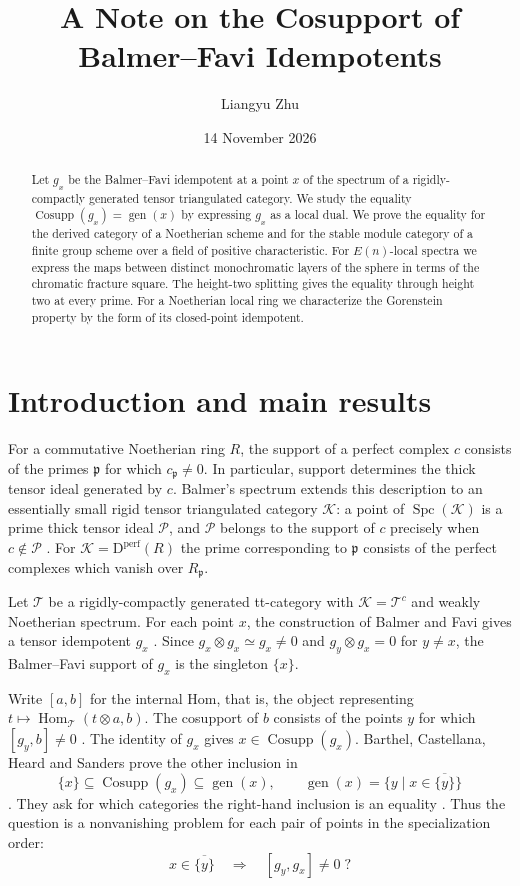 \documentclass[11pt,reqno]{amsart}
\title[Cosupport of Balmer--Favi idempotents]{A Note on the Cosupport of Balmer--Favi Idempotents}
\author{Liangyu Zhu}
\date{14 November 2026}
\theoremstyle{definition}
\DeclareMathOperator{\Cosupp}{Cosupp}
\DeclareMathOperator{\gen}{gen}
\DeclareMathOperator{\Spc}{Spc}
\DeclareMathOperator{\Hom}{Hom}
\newcommand{\T}{\mathcal T}
\newcommand{\D}{\mathrm D}
\newcommand{\p}{\mathfrak p}
\numberwithin{equation}{section}
\begin{document}
\begin{abstract}
Let $g_x$ be the Balmer--Favi idempotent at a point $x$ of the spectrum of a rigidly-compactly generated tensor triangulated category. We study the equality $\Cosupp(g_x)=\gen(x)$ by expressing $g_x$ as a local dual. We prove the equality for the derived category of a Noetherian scheme and for the stable module category of a finite group scheme over a field of positive characteristic. For $E(n)$-local spectra we express the maps between distinct monochromatic layers of the sphere in terms of the chromatic fracture square. The height-two splitting gives the equality through height two at every prime. For a Noetherian local ring we characterize the Gorenstein property by the form of its closed-point idempotent.
\end{abstract}
\maketitle
\section{Introduction and main results}

For a commutative Noetherian ring $R$, the support of a perfect complex $c$ consists of the primes $\p$ for which $c_{\p}\ne0$. In particular, support determines the thick tensor ideal generated by $c$. Balmer's spectrum extends this description to an essentially small rigid tensor triangulated category $\mathcal K$: a point of $\Spc(\mathcal K)$ is a prime thick tensor ideal $\mathcal P$, and $\mathcal P$ belongs to the support of $c$ precisely when $c\notin\mathcal P$ \cite{bal}. For $\mathcal K=\D^{\mathrm{perf}}(R)$ the prime corresponding to $\p$ consists of the perfect complexes which vanish over $R_{\p}$.

Let $\T$ be a rigidly-compactly generated tt-category with $\mathcal K=\T^c$ and weakly Noetherian spectrum. For each point $x$, the construction of Balmer and Favi gives a tensor idempotent $g_x$ \cite{bf,bchs}. Since $g_x\otimes g_x\simeq g_x\ne0$ and $g_y\otimes g_x=0$ for $y\ne x$, the Balmer--Favi support of $g_x$ is the singleton $\{x\}$.

Write $[a,b]$ for the internal Hom, that is, the object representing $t\mapsto\Hom_{\T}(t\otimes a,b)$. The cosupport of $b$ consists of the points $y$ for which $[g_y,b]\ne0$ \cite{bchs}. The identity of $g_x$ gives $x\in\Cosupp(g_x)$. Barthel, Castellana, Heard and Sanders prove the other inclusion in
\begin{equation}\label{e:bound}
 \{x\}\subseteq\Cosupp(g_x)\subseteq\gen(x),
 \qquad \gen(x)=\{y\mid x\in\overline{\{y\}}\}
\end{equation}
\cite[Lemma~4.26]{bchs}. They ask for which categories the right-hand inclusion is an equality \cite[Question~21.3]{bchs}. Thus the question is a nonvanishing problem for each pair of points in the specialization order:
\begin{equation}\label{e:question}
 x\in\overline{\{y\}}\quad\Longrightarrow\quad [g_y,g_x]\ne0\;?
\end{equation}
\end{document}
